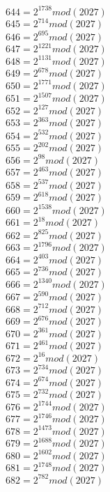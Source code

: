 \documentclass[12pt, letterpaper]{article}
\begin{document}
\begin{itemize}
\begin{multicols}{3}
$644= 2^{1738} mod (2027)$\\
$645= 2^{714} mod (2027)$\\
$646= 2^{695} mod (2027)$\\
$647= 2^{1221} mod (2027)$\\
$648= 2^{1131} mod (2027)$\\
$649= 2^{678} mod (2027)$\\
$650= 2^{1771} mod (2027)$\\
$651= 2^{1507} mod (2027)$\\
$652= 2^{127} mod (2027)$\\
$653= 2^{363} mod (2027)$\\
$654= 2^{532} mod (2027)$\\
$655= 2^{202} mod (2027)$\\
$656= 2^{98} mod (2027)$\\
$657= 2^{463} mod (2027)$\\
$658= 2^{537} mod (2027)$\\
$659= 2^{618} mod (2027)$\\
$660= 2^{1538} mod (2027)$\\
$661= 2^{18} mod (2027)$\\
$662= 2^{825} mod (2027)$\\
$663= 2^{1796} mod (2027)$\\
$664= 2^{403} mod (2027)$\\
$665= 2^{736} mod (2027)$\\
$666= 2^{1340} mod (2027)$\\
$667= 2^{590} mod (2027)$\\
$668= 2^{712} mod (2027)$\\
$669= 2^{676} mod (2027)$\\
$670= 2^{361} mod (2027)$\\
$671= 2^{461} mod (2027)$\\
$672= 2^{16} mod (2027)$\\
$673= 2^{734} mod (2027)$\\
$674= 2^{674} mod (2027)$\\
$675= 2^{732} mod (2027)$\\
$676= 2^{1744} mod (2027)$\\
$677= 2^{1746} mod (2027)$\\
$678= 2^{1473} mod (2027)$\\
$679= 2^{1688} mod (2027)$\\
$680= 2^{1602} mod (2027)$\\
$681= 2^{1748} mod (2027)$\\
$682= 2^{782} mod (2027)$\\

\end{multicols}
\end{itemize}
\end{document}
